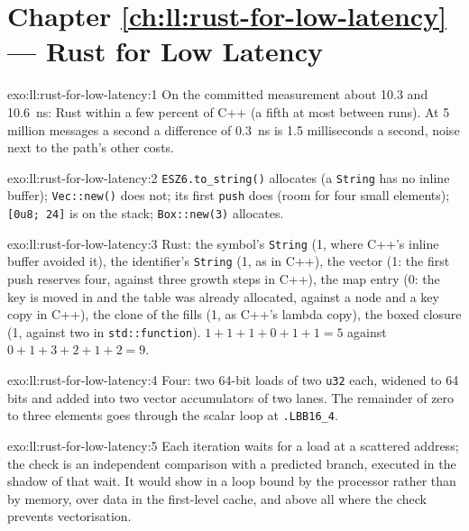 \section*{Chapter \ref{ch:ll:rust-for-low-latency} --- Rust for Low Latency}

\begin{solution}{exo:ll:rust-for-low-latency:1}
On the committed measurement about 10.3 and \qty{10.6}{\nano\second}: Rust within a few percent of C++ (a fifth at most
between runs). At 5 million messages a second a difference of \qty{0.3}{\nano\second} is 1.5 milliseconds a second, noise
next to the path's other costs.
\end{solution}

\begin{solution}{exo:ll:rust-for-low-latency:2}
\texttt{\textquotedbl{}ESZ6\textquotedbl{}.to\_string()} allocates (a \texttt{String} has no inline buffer); \texttt{Vec::new()} does not; its first
\texttt{push} does (room for four small elements); \texttt{[0u8; 24]} is on the stack; \texttt{Box::new(3)} allocates.
\end{solution}

\begin{solution}{exo:ll:rust-for-low-latency:3}
Rust: the symbol's \texttt{String} (1, where C++'s inline buffer avoided it), the identifier's \texttt{String} (1, as in
C++), the vector (1: the first push reserves four, against three growth steps in C++), the map entry (0: the key is
moved in and the table was already allocated, against a node and a key copy in C++), the clone of the fills (1, as C++'s
lambda copy), the boxed closure (1, against two in \texttt{std::function}). $1+1+1+0+1+1 = 5$ against $0+1+3+2+1+2 = 9$.
\end{solution}

\begin{solution}{exo:ll:rust-for-low-latency:4}
Four: two 64-bit loads of two \texttt{u32} each, widened to 64 bits and added into two vector accumulators of two lanes.
The remainder of zero to three elements goes through the scalar loop at \texttt{.LBB16\_4}.
\end{solution}

\begin{solution}{exo:ll:rust-for-low-latency:5}
Each iteration waits for a load at a scattered address; the check is an independent comparison with a predicted branch,
executed in the shadow of that wait. It would show in a loop bound by the processor rather than by memory, over data in the
first-level cache, and above all where the check prevents vectorisation.
\end{solution}

